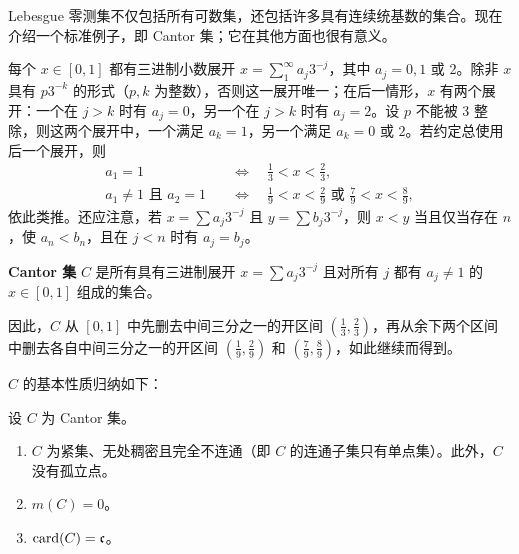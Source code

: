 \documentclass[../../main.tex]{subfiles}%
\begin{document}
Lebesgue 零测集不仅包括所有可数集，还包括许多具有连续统基数的集合。现在介绍一个标准例子，即 Cantor 集；它在其他方面也很有意义。

每个 $x\in[0,1]$ 都有三进制小数展开 $x=\sum_1^\infty a_j3^{-j}$，其中 $a_j=0,1$ 或 $2$。除非 $x$ 具有 $p3^{-k}$ 的形式（$p,k$ 为整数），否则这一展开唯一；在后一情形，$x$ 有两个展开：一个在 $j>k$ 时有 $a_j=0$，另一个在 $j>k$ 时有 $a_j=2$。设 $p$ 不能被 $3$ 整除，则这两个展开中，一个满足 $a_k=1$，另一个满足 $a_k=0$ 或 $2$。若约定总使用后一个展开，则
\begin{align*}
a_1=1&\quad\Longleftrightarrow\quad\tfrac13<x<\tfrac23,\\
a_1\ne1\text{ 且 }a_2=1&\quad\Longleftrightarrow\quad\tfrac19<x<\tfrac29\text{ 或 }\tfrac79<x<\tfrac89,
\end{align*}
依此类推。还应注意，若 $x=\sum a_j3^{-j}$ 且 $y=\sum b_j3^{-j}$，则 $x<y$ 当且仅当存在 $n$，使 $a_n<b_n$，且在 $j<n$ 时有 $a_j=b_j$。


\begin{definition}[Cantor 集]\label{definition:ch01-cantor-set-definition}
\textbf{Cantor 集} $C$ 是所有具有三进制展开 $x=\sum a_j3^{-j}$ 且对所有 $j$ 都有 $a_j\ne1$ 的 $x\in[0,1]$ 组成的集合。
\end{definition}

\begin{remark}
因此，$C$ 从 $[0,1]$ 中先删去中间三分之一的开区间 $(\frac13,\frac23)$，再从余下两个区间中删去各自中间三分之一的开区间 $(\frac19,\frac29)$ 和 $(\frac79,\frac89)$，如此继续而得到。
\end{remark}
$C$ 的基本性质归纳如下：

\begin{proposition}\label{proposition:ch01-cantor-set-properties}
设 $C$ 为 Cantor 集。
\begin{enumerate}[label=\alph*.,ref=(\alph*)]
\item\label{item:ch01-cantor-topology} $C$ 为紧集、无处稠密且完全不连通（即 $C$ 的连通子集只有单点集）。此外，$C$ 没有孤立点。
\item\label{item:ch01-cantor-null} $m(C)=0$。
\item\label{item:ch01-cantor-cardinality} $\operatorname{card}(C)=\mathfrak{c}$。
\end{enumerate}
\end{proposition}
\end{document}
